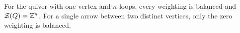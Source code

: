 \begin{example}\label{sh-0005}
For the quiver with one vertex and $n$ loops, every weighting is balanced and $\mathcal{Z}(Q) = \mathbb{Z}^{n}$. For a single arrow between two distinct vertices, only the zero weighting is balanced.
\end{example}